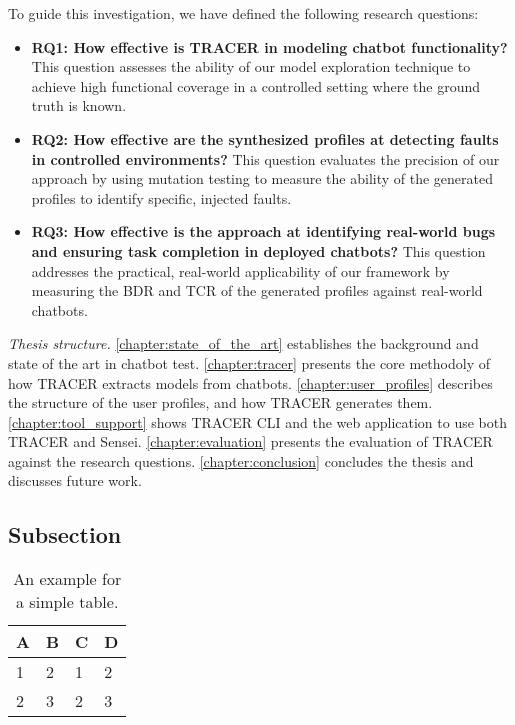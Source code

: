 To guide this investigation, we have defined the following research questions:
\begin{itemize}
\item \textbf{RQ1: How effective is TRACER in modeling chatbot functionality?}
  This question assesses the ability of our model exploration technique to achieve high functional coverage in a controlled setting where the ground truth is known.
\item \textbf{RQ2: How effective are the synthesized profiles at detecting faults in controlled environments?}
  This question evaluates the precision of our approach by using mutation testing \autocite{gomez-abajoMutationTestingTaskOriented2024}
  to measure the ability of the generated profiles to identify specific, injected faults.
\item \textbf{RQ3: How effective is the approach at identifying real-world bugs and ensuring task completion in deployed chatbots?}
  This question addresses the practical, real-world applicability of our framework
  by measuring the \ac{BDR} and \ac{TCR} of the generated profiles against real-world chatbots.
\end{itemize}

\textit{Thesis structure.}
\autoref{chapter:state_of_the_art} establishes the background and state of the art in chatbot test.
\autoref{chapter:tracer} presents the core methodoly of how \ac{TRACER} extracts models from chatbots.
\autoref{chapter:user_profiles} describes the structure of the user profiles, and how \ac{TRACER} generates them.
\autoref{chapter:tool_support} shows \ac{TRACER} \ac{CLI} and the web application to use both \ac{TRACER} and Sensei.
\autoref{chapter:evaluation} presents the evaluation of \ac{TRACER} against the research questions.
\autoref{chapter:conclusion} concludes the thesis and discusses future work.




\subsection{Subsection}


\begin{table}[htpb]
  \caption[Example table]{An example for a simple table.}\label{tab:sample}
  \centering
  \begin{tabular}{l l l l}
    \toprule
      A & B & C & D \\
    \midrule
      1 & 2 & 1 & 2 \\
      2 & 3 & 2 & 3 \\
    \bottomrule
  \end{tabular}
\end{table}

